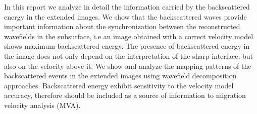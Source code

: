 In this report we analyze in detail the information carried by the backscattered energy in the extended
 images. We show that the backscattered waves provide important information about the 
synchronization between the reconstructed wavefields in the subsurface, i.e an image obtained with a correct velocity model shows maximum backscattered
energy. The presence of backscattered energy in the image does not only depend on the interpretation
of the sharp interface, but also on the velocity above it. We show and analyze the mapping patterns of the backscattered
events in the extended images using wavefield decomposition approaches. Backscattered energy
exhibit sensitivity to the velocity model accuracy, therefore should be included as a source
of information to migration velocity analysis (MVA).



 



